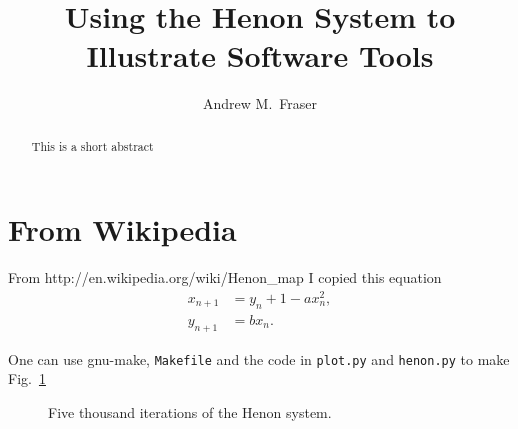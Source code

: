 \documentclass[]{article}
\title{Using the Henon System to Illustrate Software Tools}
\author{Andrew M.\ Fraser}
\begin{document}
\maketitle
\begin{abstract}
  This is a short abstract
\end{abstract}

\section{From Wikipedia}
\label{sec:wikipedia}

From http://en.wikipedia.org/wiki/Henon\_map I copied this equation
\begin{align*}
   x_{n+1} &= y_n+1-a x_n^2,\\
  y_{n+1} &= b x_n.
\end{align*}

One can use gnu-make, \texttt{Makefile} and the code in \texttt{plot.py} and
\texttt{henon.py} to make Fig.~\ref{fig:dots}
\begin{figure}
  \centering
  \caption{Five thousand iterations of the Henon system.}
  \label{fig:dots}
\end{figure}
\end{document}
